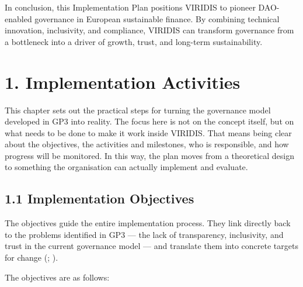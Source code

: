\documentclass[
  english,
  12pt,
  oneside,
  open=any]{scrbook}
\begin{document}
In conclusion, this Implementation Plan positions VIRIDIS to pioneer
DAO-enabled governance in European sustainable finance. By combining
technical innovation, inclusivity, and compliance, VIRIDIS can transform
governance from a bottleneck into a driver of growth, trust, and
long-term sustainability.

\chapter{1. Implementation Activities}\label{sec-activities}

This chapter sets out the practical steps for turning the governance
model developed in GP3 into reality. The focus here is not on the
concept itself, but on what needs to be done to make it work inside
VIRIDIS. That means being clear about the objectives, the activities and
milestones, who is responsible, and how progress will be monitored. In
this way, the plan moves from a theoretical design to something the
organisation can actually implement and evaluate.

\section{1.1 Implementation Objectives}\label{sec-objectives}

The objectives guide the entire implementation process. They link
directly back to the problems identified in GP3 --- the lack of
transparency, inclusivity, and trust in the current governance model ---
and translate them into concrete targets for change
(;
).

The objectives are as follows:
\end{document}

